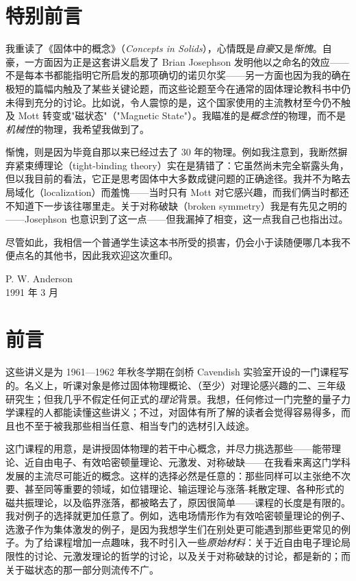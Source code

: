 
\chapter*{特别前言}

我重读了《固体中的概念》（\emph{Concepts in Solids}），心情既是\emph{自豪}又是\emph{惭愧}。自豪，一方面因为正是这套讲义启发了 Brian Josephson 发明他以之命名的效应——不是每本书都能指明它所启发的那项确切的诺贝尔奖——另一方面也因为我的确在极短的篇幅内触及了某些关键论题，而这些论题至今在通常的固体理论教科书中仍未得到充分的讨论。比如说，令人震惊的是，这个国家使用的主流教材至今仍不触及 Mott 转变或"磁状态"（"Magnetic State"）。我瞄准的是\emph{概念性}的物理，而不是\emph{机械性}的物理，我希望我做到了。

惭愧，则是因为毕竟自那以来已经过去了 30 年的物理。例如我注意到，我断然摒弃紧束缚理论（tight-binding theory）实在是猜错了：它虽然尚未完全崭露头角，但以我目前的看法，它正是思考固体中大多数成键问题的正确途径。我并不为略去局域化（localization）而羞愧——当时只有 Mott 对它感兴趣，而我们俩当时都还不知道下一步该往哪里走。关于对称破缺（broken symmetry）我是有先见之明的——Josephson 也意识到了这一点——但我漏掉了相变，这一点我自己也指出过。

尽管如此，我相信一个普通学生读这本书所受的损害，仍会小于读随便哪几本我不便点名的其他书，因此我欢迎这次重印。

\begin{flushright}
P. W. Anderson\\
1991 年 3 月
\end{flushright}

\chapter*{前言}

这些讲义是为 1961—1962 年秋冬学期在剑桥 Cavendish 实验室开设的一门课程写的。名义上，听课对象是修过固体物理概论、（至少）对理论感兴趣的二、三年级研究生；但我几乎不假定任何正式的\emph{理论}背景。我想，任何修过一门完整的量子力学课程的人都能读懂这些讲义；不过，对固体有所了解的读者会觉得容易得多，而且也不至于被我那些相当任意、相当专门的选材引入歧途。

这门课程的用意，是讲授固体物理的若干中心概念，并尽力挑选那些——能带理论、近自由电子、有效哈密顿量理论、元激发、对称破缺——在我看来离这门学科发展的主流尽可能近的概念。这样的选择必然是任意的：那些同样可以主张绝不次要、甚至同等重要的领域，如位错理论、输运理论与涨落-耗散定理、各种形式的磁共振理论，以及临界涨落，都被略去了，原因很简单——课程的长度是有限的。我对例子的选择就更加任意了。例如，选电场情形作为有效哈密顿量理论的例子、选激子作为集体激发的例子，是因为我想学生们在别处更可能遇到那些更常见的例子。为了给课程增加一点趣味，我不时引入一些\emph{原始材料}：关于近自由电子理论局限性的讨论、元激发理论的哲学的讨论，以及关于对称破缺的讨论，都是新的；而关于磁状态的那一部分则流传不广。

